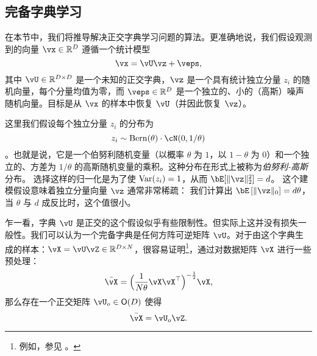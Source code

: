 \documentclass[../../book-main.tex]{subfiles}
\begin{document}
\subsection{完备字典学习}
\label{sec:complete-dictionary}

在本节中，我们将推导解决正交字典学习问题的算法。更准确地说，我们假设观测到的向量 $\vx \in \R^D$ 遵循一个统计模型
\begin{equation}
    \vx = \vU \vz + \veps, 
    \label{eq:ica-model-ch2}
\end{equation}
其中 $\vU \in \R^{D \times D}$ 是一个未知的正交字典，$\vz$ 是一个具有统计独立分量 $z_i$ 的随机向量，每个分量均值为零，而 $\veps \in \R^D$ 是一个独立的、小的（高斯）噪声随机向量。目标是从 $\vx$ 的样本中恢复 $\vU$（并因此恢复 $\vz$）。

这里我们假设每个独立分量 $z_i$ 的分布为 $$z_i \sim \mathrm{Bern}(\theta) \cdot \cN(0, 1/\theta)$$。也就是说，它是一个伯努利随机变量（以概率 $\theta$ 为 $1$，以 $1-\theta$ 为 $0$）和一个独立的、方差为 $1/\theta$ 的高斯随机变量的乘积。这种分布在形式上被称为\textit{伯努利-高斯}分布。
选择这样的归一化是为了使 $\operatorname{Var}(z_i) = 1$，从而 $\bE[\norm{\vz}_2^2]=d$。
这个建模假设意味着独立分量向量 $\vz$ 通常非常稀疏：
我们计算出 $\bE\left[\norm{\vz}_0\right] = d\theta$，当 $\theta$ 与 $d$ 成反比时，这个值很小。

\begin{remark}[正交假设] 
乍一看，字典 $\vU$ 是正交的这个假设似乎有些限制性。但实际上这并没有损失一般性。我们可以认为一个完备字典是任何方阵可逆矩阵 $\vU$。对于由这个字典生成的样本：$\vX = \vU \vZ \in \mathbb{R}^{D\times N}$，很容易证明\footnote{例如，参见 \cite{sun2017completeI}。}，通过对数据矩阵 $\vX$ 进行一些预处理：
\begin{equation}
    \bar{\vX} = \Big(\frac{1}{N\theta} \vX\vX^\top\Big)^{-\frac{1}{2}}\vX,
\end{equation}
那么存在一个正交矩阵 $\vU_{o} \in \O(D)$ 使得
\begin{equation}
    \bar{\vX} = \vU_{o}\vZ.
\end{equation}
\end{remark}
\end{document}
